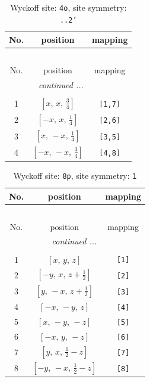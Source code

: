 \documentclass[fleqn,8pt]{jsarticle}
\begin{document}
\renewcommand{\arraystretch}{1.2}
\begin{longtable}{ccc}
\caption{Wyckoff site: {\tt 4o}, site symmetry: {\tt ..2'}}
 \\
 \hline \hline
No. & position & mapping \\ \hline \endfirsthead

\multicolumn{2}{l}{\tablename\ \thetable{}} \\
 \hline \hline
No. & position & mapping \\ \hline \endhead

 \hline \hline
\multicolumn{2}{r}{\footnotesize\it continued ...} \\ \endfoot

 \hline \hline
\multicolumn{2}{r}{} \\ \endlastfoot

1 & $\left[ x,\, x,\, \frac{3}{4} \right]$ & {\tt [1,7]} \\ \hline
2 & $\left[ - x,\, x,\, \frac{1}{4} \right]$ & {\tt [2,6]} \\ \hline
3 & $\left[ x,\, - x,\, \frac{1}{4} \right]$ & {\tt [3,5]} \\ \hline
4 & $\left[ - x,\, - x,\, \frac{3}{4} \right]$ & {\tt [4,8]} \\
\end{longtable}
\renewcommand{\arraystretch}{1.2}
\begin{longtable}{ccc}
\caption{Wyckoff site: {\tt 8p}, site symmetry: {\tt 1}}
 \\
 \hline \hline
No. & position & mapping \\ \hline \endfirsthead

\multicolumn{2}{l}{\tablename\ \thetable{}} \\
 \hline \hline
No. & position & mapping \\ \hline \endhead

 \hline \hline
\multicolumn{2}{r}{\footnotesize\it continued ...} \\ \endfoot

 \hline \hline
\multicolumn{2}{r}{} \\ \endlastfoot

1 & $\left[ x,\, y,\, z \right]$ & {\tt [1]} \\ \hline
2 & $\left[ - y,\, x,\, z + \frac{1}{2} \right]$ & {\tt [2]} \\ \hline
3 & $\left[ y,\, - x,\, z + \frac{1}{2} \right]$ & {\tt [3]} \\ \hline
4 & $\left[ - x,\, - y,\, z \right]$ & {\tt [4]} \\ \hline
5 & $\left[ x,\, - y,\, - z \right]$ & {\tt [5]} \\ \hline
6 & $\left[ - x,\, y,\, - z \right]$ & {\tt [6]} \\ \hline
7 & $\left[ y,\, x,\, \frac{1}{2} - z \right]$ & {\tt [7]} \\ \hline
8 & $\left[ - y,\, - x,\, \frac{1}{2} - z \right]$ & {\tt [8]} \\
\end{longtable}
\end{document}
